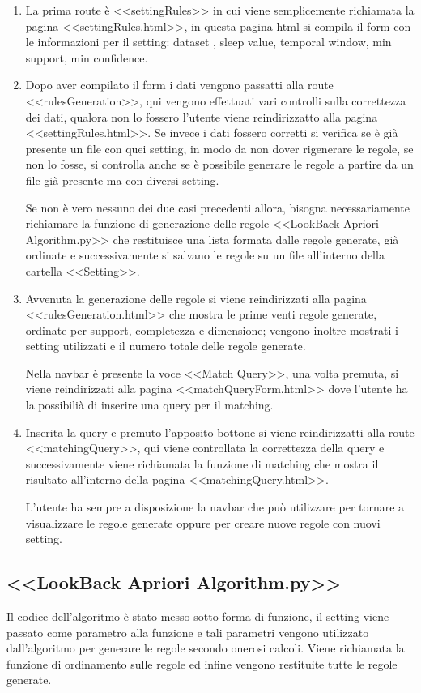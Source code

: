 \documentclass[a4paper]{article}
\begin{document}
\begin{enumerate}
\item
La prima route è <<settingRules>> in cui viene semplicemente richiamata la pagina <<settingRules.html>>, in questa pagina html si compila il form con le informazioni per il setting: dataset , sleep value, temporal window, min support, min confidence. 

\item
Dopo aver compilato il form i dati vengono passatti alla route <<rulesGeneration>>, qui vengono effettuati vari controlli sulla correttezza dei dati, qualora non lo fossero l'utente viene reindirizzatto alla pagina <<settingRules.html>>. Se invece i dati fossero corretti si verifica se è già presente un file con quei  setting, in modo da non dover rigenerare le regole, se non lo fosse, si controlla anche se è possibile generare le regole a partire da un file già presente ma con diversi setting.

 Se non è vero nessuno dei due casi precedenti allora, bisogna necessariamente  richiamare la funzione di generazione delle regole <<LookBack Apriori Algorithm.py>> che restituisce una lista formata dalle regole generate, già ordinate e successivamente si salvano le regole su un file all'interno della cartella <<Setting>>.

\item
Avvenuta la generazione delle regole si viene reindirizzati alla pagina <<rulesGeneration.html>> che mostra le prime venti regole generate, ordinate per support, completezza e dimensione; vengono inoltre mostrati i setting utilizzati e il numero totale delle regole generate.

Nella navbar è presente la voce <<Match Query>>, una volta premuta, si viene reindirizzati alla pagina <<matchQueryForm.html>> dove l'utente ha la possibilià di inserire una query per il matching.

\item
Inserita la query e premuto l'apposito bottone si viene reindirizzatti alla route <<matchingQuery>>, qui viene controllata la correttezza della query e successivamente viene richiamata la funzione di matching che mostra il risultato all'interno della pagina <<matchingQuery.html>>.

L'utente ha sempre a disposizione la navbar che può utilizzare per tornare a visualizzare le regole generate oppure per creare nuove regole con nuovi setting.

\end{enumerate}
\subsection{<<LookBack Apriori Algorithm.py>>}
Il codice dell'algoritmo è stato messo sotto forma di funzione, il setting viene passato come parametro alla funzione e tali parametri vengono utilizzato dall'algoritmo per generare le regole secondo onerosi calcoli.
Viene richiamata la funzione di ordinamento sulle regole ed infine vengono restituite tutte le regole generate.
\end{document}
